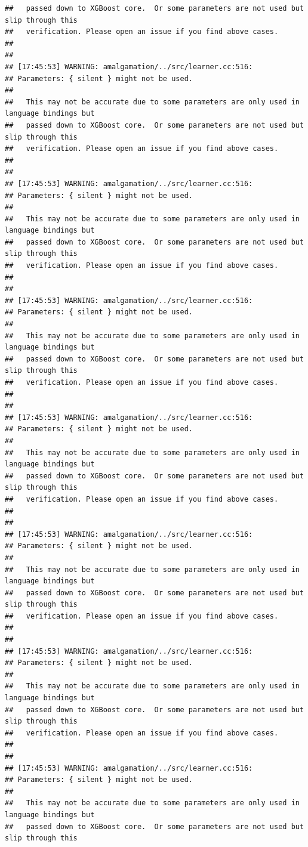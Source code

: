 \documentclass[AMS,STIX2COL]{WileyNJD-v2}\usepackage[]{graphicx}\usepackage[]{color}
\makeatletter
\newenvironment{kframe}{%
 \def\at@end@of@kframe{}%
 \ifinner\ifhmode%
  \def\at@end@of@kframe{\end{minipage}}%
  \begin{minipage}{\columnwidth}%
 \fi\fi%
 \def\FrameCommand##1{\hskip\@totalleftmargin \hskip-\fboxsep
 \colorbox{shadecolor}{##1}\hskip-\fboxsep
     \hskip-\linewidth \hskip-\@totalleftmargin \hskip\columnwidth}%
 \MakeFramed {\advance\hsize-\width
   \@totalleftmargin\z@ \linewidth\hsize
   \@setminipage}}%
 {\par\unskip\endMakeFramed%
 \at@end@of@kframe}
\newenvironment{knitrout}{}{} %
\makeatother
\begin{document}
\begin{knitrout}
\begin{kframe}
\begin{verbatim}
##   passed down to XGBoost core.  Or some parameters are not used but slip through this
##   verification. Please open an issue if you find above cases.
## 
## 
## [17:45:53] WARNING: amalgamation/../src/learner.cc:516: 
## Parameters: { silent } might not be used.
## 
##   This may not be accurate due to some parameters are only used in language bindings but
##   passed down to XGBoost core.  Or some parameters are not used but slip through this
##   verification. Please open an issue if you find above cases.
## 
## 
## [17:45:53] WARNING: amalgamation/../src/learner.cc:516: 
## Parameters: { silent } might not be used.
## 
##   This may not be accurate due to some parameters are only used in language bindings but
##   passed down to XGBoost core.  Or some parameters are not used but slip through this
##   verification. Please open an issue if you find above cases.
## 
## 
## [17:45:53] WARNING: amalgamation/../src/learner.cc:516: 
## Parameters: { silent } might not be used.
## 
##   This may not be accurate due to some parameters are only used in language bindings but
##   passed down to XGBoost core.  Or some parameters are not used but slip through this
##   verification. Please open an issue if you find above cases.
## 
## 
## [17:45:53] WARNING: amalgamation/../src/learner.cc:516: 
## Parameters: { silent } might not be used.
## 
##   This may not be accurate due to some parameters are only used in language bindings but
##   passed down to XGBoost core.  Or some parameters are not used but slip through this
##   verification. Please open an issue if you find above cases.
## 
## 
## [17:45:53] WARNING: amalgamation/../src/learner.cc:516: 
## Parameters: { silent } might not be used.
## 
##   This may not be accurate due to some parameters are only used in language bindings but
##   passed down to XGBoost core.  Or some parameters are not used but slip through this
##   verification. Please open an issue if you find above cases.
## 
## 
## [17:45:53] WARNING: amalgamation/../src/learner.cc:516: 
## Parameters: { silent } might not be used.
## 
##   This may not be accurate due to some parameters are only used in language bindings but
##   passed down to XGBoost core.  Or some parameters are not used but slip through this
##   verification. Please open an issue if you find above cases.
## 
## 
## [17:45:53] WARNING: amalgamation/../src/learner.cc:516: 
## Parameters: { silent } might not be used.
## 
##   This may not be accurate due to some parameters are only used in language bindings but
##   passed down to XGBoost core.  Or some parameters are not used but slip through this

\end{verbatim}
\end{kframe}
\end{knitrout}
\end{document}

